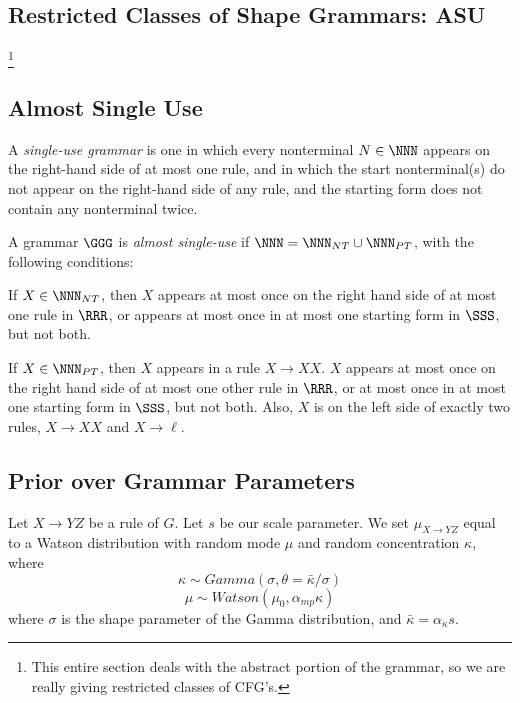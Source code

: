 

\subsection{Restricted Classes of Shape Grammars: ASU}

\footnote{ This entire section deals with the abstract portion of the
  grammar, so we are really giving restricted classes of CFG's.}

\subsection{Almost Single Use}

\begin{defn}
A {\em single-use grammar} is one in which every nonterminal $N\in
\NNN$ appears on the right-hand side of at most one rule, and in which
the start nonterminal(s) do not appear on the right-hand side of any rule,
and the starting form does not contain any nonterminal twice.
\end{defn}

\begin{defn}
A grammar $\GGG$ is {\em almost single-use} if $\NNN = \NNN_{NT} \cup
\NNN_{PT}$, with the following conditions:
\bitem
\item If $X\in \NNN_{NT}$, then $X$ appears at most once on the right
  hand side of at most one rule in $\RRR$, or appears at most once in
  at most one starting form in $\SSS$, but not both.
\item If $X\in \NNN_{PT}$, then $X$ appears in a rule $X\to XX$. $X$
  appears at most once on the right hand side of at most one other
  rule in $\RRR$, or at most once in at most one starting form in
  $\SSS$, but not both. Also, $X$ is on the left side of exactly two
  rules, $X\to XX$ and $X\to \ell$.
\eitem
\end{defn}

\subsection{Prior over Grammar Parameters}
\label{sec-prior-param}

Let $X\to YZ$ be a rule of $G$. Let $s$ be our scale parameter.  We
set $\mu_{X\to YZ}$ equal to a Watson distribution with random mode $\mu$ and
random concentration $\kappa$, where
$$\kappa \sim Gamma(\sigma, \theta=\bar{\kappa}/\sigma)$$
$$\mu \sim Watson(\mu_0, \alpha_{mp} \kappa)$$
where $\sigma$ is the shape parameter of the Gamma distribution, and
$\bar{\kappa} = \alpha_{\kappa} s$. 

